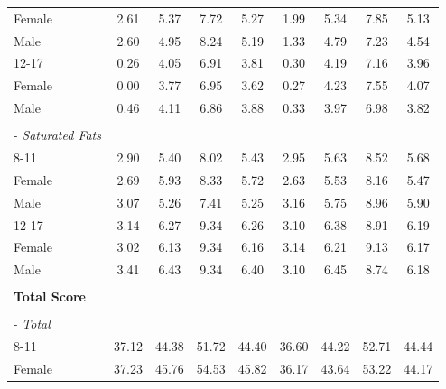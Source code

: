 \documentclass[12pt,leqno,titlepage]{amsart}
\newcommand{\1}{\mathbbm{1}}
\begin{document}
\begin{bibunit}
\begin{longtable}{@{\extracolsep{\fill}}lcccc|cccc@{}}
\hspace*{4.4em}Female & 2.61 & 5.37 & 7.72 & 5.27 & 1.99 & 5.34 & 7.85 & 5.13 \\
\hspace*{4.4em}Male & 2.60 & 4.95 & 8.24 & 5.19 & 1.33 & 4.79 & 7.23 & 4.54 \\
\hspace*{2.2em}12-17 & 0.26 & 4.05 & 6.91 & 3.81 & 0.30 & 4.19 & 7.16 & 3.96 \\
\hspace*{4.4em}Female & 0.00 & 3.77 & 6.95 & 3.62 & 0.27 & 4.23 & 7.55 & 4.07 \\
\hspace*{4.4em}Male & 0.46 & 4.11 & 6.86 & 3.88 & 0.33 & 3.97 & 6.98 & 3.82 \\
\rule{0pt}{1.1em} & & & & & & & & \\
\hspace*{0.8em}- \textit{Saturated Fats} & & & & & & & & \\
\hspace*{2.2em}8-11 & 2.90 & 5.40 & 8.02 & 5.43 & 2.95 & 5.63 & 8.52 & 5.68 \\
\hspace*{4.4em}Female & 2.69 & 5.93 & 8.33 & 5.72 & 2.63 & 5.53 & 8.16 & 5.47 \\
\hspace*{4.4em}Male & 3.07 & 5.26 & 7.41 & 5.25 & 3.16 & 5.75 & 8.96 & 5.90 \\
\hspace*{2.2em}12-17 & 3.14 & 6.27 & 9.34 & 6.26 & 3.10 & 6.38 & 8.91 & 6.19 \\
\hspace*{4.4em}Female & 3.02 & 6.13 & 9.34 & 6.16 & 3.14 & 6.21 & 9.13 & 6.17 \\
\hspace*{4.4em}Male & 3.41 & 6.43 & 9.34 & 6.40 & 3.10 & 6.45 & 8.74 & 6.18 \\
\rule{0pt}{1.1em} & & & & & & & & \\
\hspace*{0.8em}\textbf{Total Score} & & & & & & & & \\
\rule{0pt}{0.35em} & & & & & & & & \\
\hspace*{0.8em}- \textit{Total} & & & & & & & & \\
\hspace*{2.2em}8-11 & 37.12 & 44.38 & 51.72 & 44.40 & 36.60 & 44.22 & 52.71 & 44.44 \\
\hspace*{4.4em}Female & 37.23 & 45.76 & 54.53 & 45.82 & 36.17 & 43.64 & 53.22 & 44.17 \\

\end{longtable}
\end{bibunit}
\end{document}
